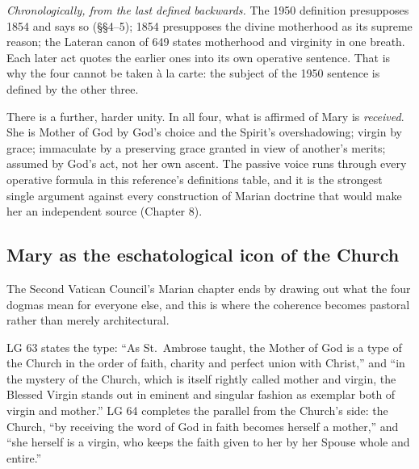 \emph{Chronologically, from the last defined backwards.} The 1950
definition presupposes 1854 and says so (\S\S4--5); 1854 presupposes the
divine motherhood as its supreme reason; the Lateran canon of 649 states
motherhood and virginity in one breath. Each later act quotes the earlier
ones into its own operative sentence. That is why the four cannot be
taken \`a la carte: the subject of the 1950 sentence is defined by the
other three.

There is a further, harder unity. In all four, what is affirmed of Mary
is \emph{received}. She is Mother of God by God's choice and the Spirit's
overshadowing; virgin by grace; immaculate by a preserving grace granted
in view of another's merits; assumed by God's act, not her own ascent.
The passive voice runs through every operative formula in this
reference's definitions table, and it is the strongest single argument
against every construction of Marian doctrine that would make her an
independent source (Chapter 8).

\subsection*{Mary as the eschatological icon of the Church}

The Second Vatican Council's Marian chapter ends by drawing out what the
four dogmas mean for everyone else, and this is where the coherence
becomes pastoral rather than merely architectural.

LG 63 states the type: ``As St.\ Ambrose taught, the Mother of God is a
type of the Church in the order of faith, charity and perfect union with
Christ,'' and ``in the mystery of the Church, which is itself rightly
called mother and virgin, the Blessed Virgin stands out in eminent and
singular fashion as exemplar both of virgin and mother.'' LG 64 completes
the parallel from the Church's side: the Church, ``by receiving the word
of God in faith becomes herself a mother,'' and ``she herself is a
virgin, who keeps the faith given to her by her Spouse whole and
entire.''

